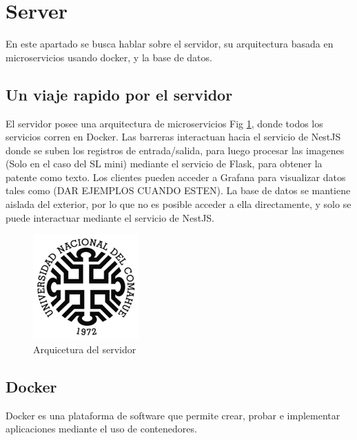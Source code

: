 \section{Server}

En este apartado se busca hablar sobre el servidor, su arquitectura basada en microservicios usando docker, y la base de datos.

\subsection{Un viaje rapido por el servidor}

El servidor posee una arquitectura de microservicios Fig \ref{fig:server}, donde todos los servicios corren en Docker. Las barreras interactuan hacia el servicio de NestJS donde se suben los registros de entrada/salida, para luego procesar las imagenes (Solo en el caso del SL mini) mediante el servicio de Flask, para obtener la patente como texto. Los clientes pueden acceder a Grafana para visualizar datos tales como (DAR EJEMPLOS CUANDO ESTEN). La base de datos se mantiene aislada del exterior, por lo que no es posible acceder a ella directamente, y solo se puede interactuar mediante el servicio de NestJS.

\begin{figure}
        \centering
        \includegraphics[width=.5\textwidth]{imgs/uncoma.png}
        \caption{Arquicetura del servidor}
        \label{fig:server}
\end{figure}

\subsection{Docker}

Docker es una plataforma de software que permite crear, probar e implementar aplicaciones mediante el uso de contenedores.

